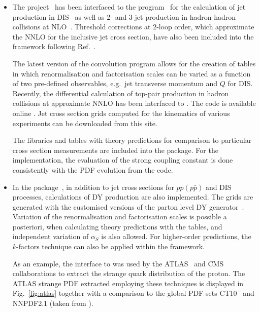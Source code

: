 \begin{itemize}
  \item The \fastnlo project~\cite{Kluge:2006xs} has been interfaced
    to the \nlojetpp program~\cite{Nagy:1998bb} for the calculation of
    jet production in DIS~\cite{Nagy:2001xb} as well as 2- and 3-jet
    production in hadron-hadron collisions at
    NLO~\cite{Nagy:2003tz,Nagy:2001fj}.  Threshold corrections at 2-loop
    order, which approximate the NNLO for the inclusive jet cross
    section, have also been included into the framework \cite{Wobisch:2011ij} 
    following Ref.~\cite{Kidonakis:2000gi}.
  
    The latest version of the \fastnlo convolution program \cite{Britzger:2012bs} allows for the
    creation of tables in which renormalisation and factorisation scales
    can be varied as a function of two pre-defined observables, e.g.\ jet
    transverse momentum \pperp and $Q$ for DIS\@. 
    Recently, the differential calculation of top-pair production in hadron collisions 
    at approximate NNLO \cite{Guzzi:2014wia} has been interfaced to \fastnlo \cite{dis2014Fast}.
    The \fastnlo code is available online \cite{fastNLO:HepForge}.
    Jet cross section grids computed for the kinematics of various experiments
    can be downloaded from this site.

    The \fastnlo libraries and tables with theory predictions  for comparison to
    particular cross section measurements are included into the \fitter package. 
    For the \fitter implementation, the evaluation of the strong coupling constant is done
    consistently with the PDF evolution from the \qcdnum code. 
\\
\item In the \applgrid package~\cite{Carli:2010rw,APPLGRID:HepForge},
    in addition to jet cross sections for
    $pp(p\bar p)$ and DIS processes, calculations 
    of DY production are also implemented. The grids are generated with
    the customised versions of the \mcfm parton level DY
    generator~\cite{Campbell:1999ah,Campbell:2000je,Campbell:2010ff}.
    Variation of the renormalisation and factorisation scales is possible a posteriori,
    when calculating theory predictions with the \applgrid  tables, and
    independent variation of $\alpha_S$ is also allowed.
    For higher-order predictions, the $k$-factors technique can also be applied
    within the \applgrid framework.

    As an example, the \fitter interface to \applgrid was used by the ATLAS~\cite{atlas:strange}
    and CMS~\cite{cms:strange} collaborations to extract the strange quark distribution of the proton.
    The ATLAS strange PDF extracted employing these techniques is displayed in
    Fig.~\ref{fig:atlas} together with a comparison to the global PDF
    sets CT10~\cite{CT10pdf} and NNPDF2.1 \cite{NNPDFpdf} (taken from \cite{atlas:strange}).


\end{itemize}
